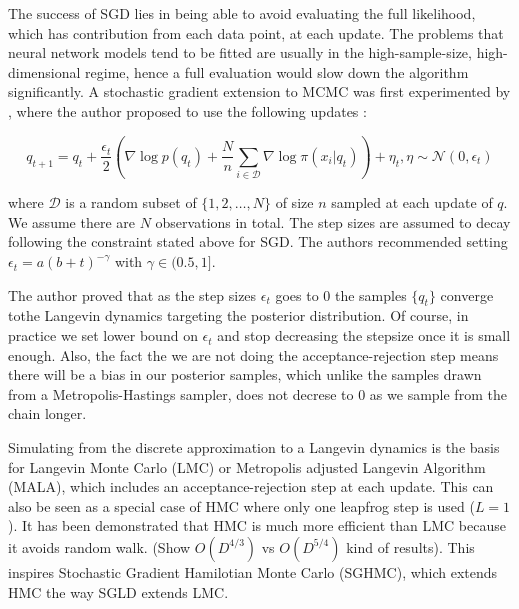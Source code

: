 \documentclass[12pt]{report}
\begin{document}
The success of SGD lies in being able to avoid evaluating the full likelihood, which has contribution from each data point, at each update. The problems that neural network models tend to be fitted are usually in the high-sample-size, high-dimensional regime, hence a full evaluation would slow down the algorithm significantly. A stochastic gradient extension to MCMC was first experimented by \cite{welling2011bayesian}, where the author proposed to use the following updates :

\[q_{t+1} = q_t + \frac{\epsilon_t}{2} ( \nabla \log p(q_t) + \frac{N}{n} \sum_{i \in \mathcal{D}} \nabla \log \pi(x_i|q_t) ) + \eta_t , \eta \sim \mathcal{N}(0,\epsilon_t) \]

where $\mathcal{D}$ is a random subset of $\{1,2, \dots, N\}$ of size $n$ sampled at each update of $q$. We assume there are $N$ observations in total. The step sizes are assumed to decay following the constraint stated above for SGD. The authors recommended setting $\epsilon_t = a(b+t)^{-\gamma} $ with $\gamma \in (0.5,1]$.  

The author proved that as the step sizes $\epsilon_t$ goes to $0$ the samples $\{q_t\}$ converge tothe Langevin dynamics targeting the posterior distribution. Of course, in practice we set lower bound on $\epsilon_t$ and stop decreasing the stepsize once it is small enough. Also, the fact the we are not doing the acceptance-rejection step means there will be a bias in our posterior samples, which unlike the samples drawn from a Metropolis-Hastings sampler, does not decrese to $0$ as we sample from the chain longer.


Simulating from the discrete approximation to a Langevin dynamics is the basis
for Langevin Monte Carlo (LMC) or Metropolis adjusted Langevin Algorithm (MALA), which
includes an acceptance-rejection step at each update. This can also be seen as a
special case of HMC where only one leapfrog step is used ($L=1$). It has been
demonstrated that HMC is much more efficient than LMC because it avoids random
walk. (Show $O(D^{4/3})$ vs $O(D^{5/4})$ kind of results). This inspires
Stochastic Gradient Hamilotian Monte Carlo (SGHMC), 
which extends HMC the way SGLD extends LMC. 
\end{document}
